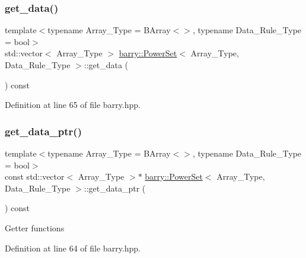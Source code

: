 \subsubsection{\texorpdfstring{get\+\_\+data()}{get\_data()}}
{\footnotesize\ttfamily template$<$typename Array\+\_\+\+Type  = B\+Array$<$$>$, typename Data\+\_\+\+Rule\+\_\+\+Type  = bool$>$ \\
std\+::vector$<$ Array\+\_\+\+Type $>$ \hyperlink{classbarry_1_1_power_set}{barry\+::\+Power\+Set}$<$ Array\+\_\+\+Type, Data\+\_\+\+Rule\+\_\+\+Type $>$\+::get\+\_\+data (\begin{DoxyParamCaption}{ }\end{DoxyParamCaption}) const\hspace{0.3cm}{\ttfamily [inline]}}



Definition at line 65 of file barry.\+hpp.

\mbox{\label{classbarry_1_1_power_set_a80b283b1ac115f1be049a09f1a69586a}} 
\subsubsection{\texorpdfstring{get\+\_\+data\+\_\+ptr()}{get\_data\_ptr()}}
{\footnotesize\ttfamily template$<$typename Array\+\_\+\+Type  = B\+Array$<$$>$, typename Data\+\_\+\+Rule\+\_\+\+Type  = bool$>$ \\
const std\+::vector$<$ Array\+\_\+\+Type $>$$\ast$ \hyperlink{classbarry_1_1_power_set}{barry\+::\+Power\+Set}$<$ Array\+\_\+\+Type, Data\+\_\+\+Rule\+\_\+\+Type $>$\+::get\+\_\+data\+\_\+ptr (\begin{DoxyParamCaption}{ }\end{DoxyParamCaption}) const\hspace{0.3cm}{\ttfamily [inline]}}

Getter functions 

Definition at line 64 of file barry.\+hpp.

\mbox{\label{classbarry_1_1_power_set_a8eefc9606c6339938a8d9adcd0d7e153}} 
